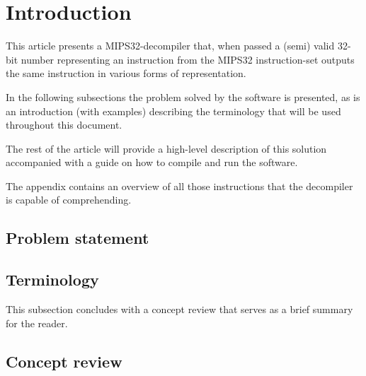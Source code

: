 \section{Introduction}

This article presents a MIPS32-decompiler that, when passed a (semi) valid
32-bit number representing an instruction from the MIPS32 instruction-set
outputs the same instruction in various forms of representation.

In the following subsections the problem solved by the software is
presented, as is an introduction (with examples) describing the
terminology that will be used throughout this document.

The rest of the article will provide a high-level description of this
solution accompanied with a guide on how to compile and run the
software.

The appendix contains an overview of all those instructions that
the decompiler is capable of comprehending.

\subsection{Problem statement}

\subsection{Terminology}

This subsection concludes with a concept review that serves as a brief
summary for the reader.


\subsection{Concept review}
